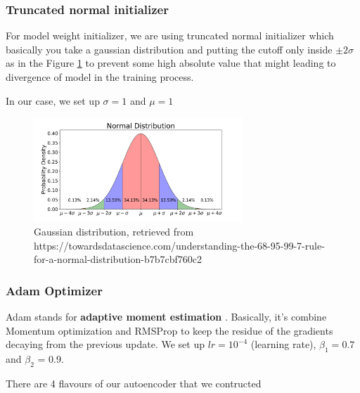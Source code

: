 \subsubsection*{Truncated normal initializer}
For model weight initializer, we are using truncated normal initializer which basically you take a gaussian distribution and putting the cutoff only inside $\pm2\sigma$ as in the Figure \ref{fig:normal_dist} to prevent some high absolute value that might leading to divergence of model in the training process.

In our case, we set up $\sigma=1$ and $\mu=1$ 
\begin{figure}[h!]
    \centering
    \includegraphics[width=0.7\textwidth]{images/normal_dist.png}
    \caption{Gaussian distribution, retrieved from https://towardsdatascience.com/understanding-the-68-95-99-7-rule-for-a-normal-distribution-b7b7cbf760c2}
    \label{fig:normal_dist}
\end{figure}

\subsubsection*{Adam Optimizer}
Adam stands for \textbf{adaptive moment estimation} \cite{adam}. Basically, it's combine Momentum optimization and RMSProp to keep the residue of the gradients decaying from the previous update.
We set up $lr = 10^{-4}$ (learning rate), $\beta_1 = 0.7$ and $\beta_2$ = 0.9.
\vspace{0.4in}
\par There are 4 flavours of our autoencoder that we contructed

